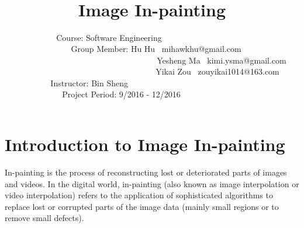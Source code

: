 \documentclass[12pt]{article}
\begin{document}
\title{\huge\textbf{\ \\ \ \\Image In-painting}\vspace{11cm}}
\author{	
	\large
	Course: Software Engineering\ \ \ \ \ \ \  \ \  \  \  \ \ \ \ \ \  \ \ \ \ \\
	\ \ \ \ \ \ \ \ \ \ \ Group Member: Hu Hu \ mihawkhu@gmail.com\ \ \ \ \ \ \ \ \ \\
	\ \ \ \ \ \ \ \ \  \ \ \ \ \ \ \ \ \ \ \ \ \ \ \ \ \ \ \ \ \ \ \ \ \ Yesheng Ma \ kimi.ysma@gmail.com \\
	\ \ \ \ \ \ \ \ \  \ \ \ \ \ \ \ \ \ \ \ \ \ \ \ \ \ \ \ \ \ \   \ Yikai Zou \ zouyikai1014@163.com\\
	Instructor: Bin Sheng \ \ \ \ \ \ \ \  \ \ \ \ \ \ \ \ \ \ \ \ \ \ \  \ \ \ \ \ \ \ \\
	Project Period: 9/2016 - 12/2016\ \ \ \ \  \ \ \ \ \ \ \ \ \ \ 	
	} \date{ }

\maketitle\thispagestyle{empty}
\newpage
\tableofcontents\thispagestyle{empty}
\newpage


\section{Introduction to Image In-painting}
In-painting is the process of reconstructing lost or deteriorated parts of images and videos. In the digital world, in-painting (also known as image interpolation or video interpolation) refers to the application of sophisticated algorithms to replace lost or corrupted parts of the image data (mainly small regions or to remove small defects).
\end{document}
